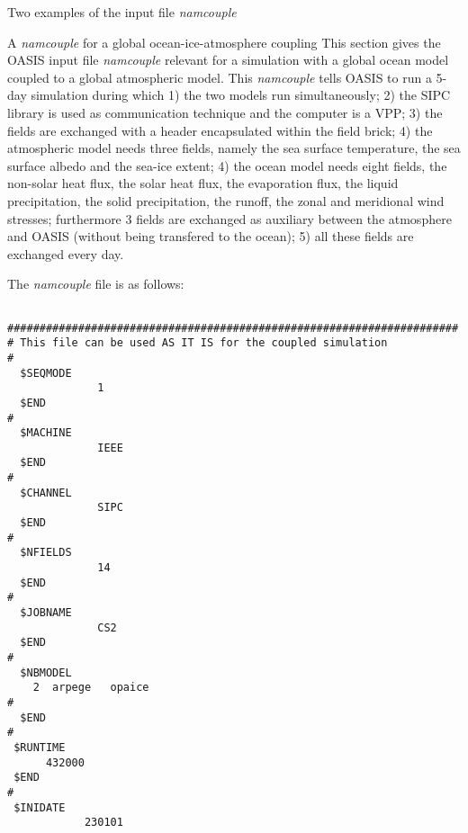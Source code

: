 \begin{section}{Two examples of the input file {\em namcouple}}
\begin{subsection}{A {\em namcouple} for a global ocean-ice-atmosphere coupling}
This section gives the OASIS input file {\em namcouple} relevant
for a simulation with a global ocean model coupled to a global 
atmospheric model. This {\em namcouple}
tells OASIS to run a 5-day simulation during which
1) the two models run simultaneously; 2) the SIPC library is used 
as communication technique and the computer is a  VPP; 3) the fields are
exchanged with a header encapsulated within 
the field brick; 4) the 
atmospheric model needs three fields, namely the sea surface 
temperature, the sea surface albedo and the sea-ice extent; 4) the ocean model needs eight fields, the non-solar heat flux, the solar heat flux, the
evaporation flux, the liquid precipitation, the solid precipitation, the
runoff, the zonal and meridional wind stresses; furthermore 3 fields are
exchanged as auxiliary between the atmosphere and OASIS (without being
transfered to the ocean); 5) all these fields 
are exchanged every day.

The {\em namcouple} file is as follows:
\begin{verbatim}

######################################################################
# This file can be used AS IT IS for the coupled simulation
#                                                                              
  $SEQMODE                                                                     
              1                                                                
  $END                                                                        
# 
  $MACHINE                                                                     
              IEEE                                                            
  $END                                                                         
#  
  $CHANNEL                                                                     
              SIPC                                                            
  $END
# 
  $NFIELDS                                                                     
              14
  $END  
# 
  $JOBNAME                                                                  
              CS2                                                         
  $END                                                                  
#  
  $NBMODEL                                                                   
    2  arpege   opaice                                                       
# 
  $END                                                                       
#   
 $RUNTIME                                                                   
      432000 
 $END                                                                        
#   
 $INIDATE                                                                    
            230101                                                          
    

\end{verbatim}
\end{subsection}
\end{section}
